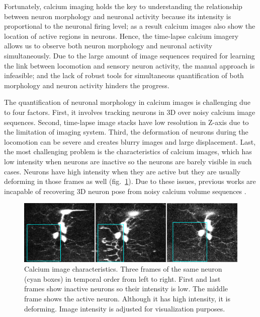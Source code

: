 \documentclass{article}
\begin{document}
Fortunately, calcium imaging holds the key to understanding the relationship between neuron morphology and neuronal activity because its intensity is proportional to the neuronal firing level; as a result calcium images also show the location of active regions in neurons. Hence, the time-lapse calcium imagery allows us to observe both neuron morphology and neuronal activity simultaneously. Due to the large amount of image sequences required for learning the link between locomotion and sensory neuron activity, the manual approach is infeasible; and the lack of robust tools for simultaneous quantification of both morphology and neuron activity hinders the progress.

The quantification of neuronal morphology in calcium images is challenging due to four factors. First, it involves tracking neurons in 3D over noisy calcium image sequences. Second, time-lapse image stacks have low resolution in Z-axis due to the limitation of imaging system. Third, the deformation of neurons during the locomotion can be severe and creates blurry images and large displacement. Last, the most challenging problem is the characteristics of calcium images, which has low intensity when neurons are inactive so the neurons are barely visible in such cases. Neurons have high intensity when they are active but they are usually deforming in those frames as well (fig.~\ref{fig:calcium_img}). Due to these issues, previous works are incapable of recovering 3D neuron pose from noisy calcium volume sequences \cite{Ferrari2009, Glowacki2017, Gulyanon2017, Gulyanon2018a}.

\begin{figure}[t]
	\centering
	\vspace{-10pt}
	\includegraphics[width=1.0\linewidth]{img/calcium_img}
	\vspace{-20pt}
	\caption{\small{Calcium image characteristics. Three frames of the same neuron (cyan boxes) in temporal order from left to right. First and last frames show inactive neurons so their intensity is low. The middle frame shows the active neuron. Although it has high intensity, it is deforming. Image intensity is adjusted for visualization purposes.}}
	\label{fig:calcium_img}
	\vspace{-10pt}
\end{figure}
\end{document}
